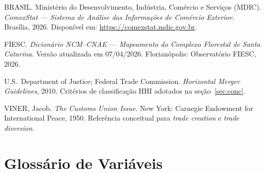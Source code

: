 \documentclass[12pt, a4paper]{article}
\begin{document}
\begin{enumerate}[label={[\arabic*]}]
  \item BRASIL. Ministério do Desenvolvimento, Indústria, Comércio e Serviços
        (MDIC). \textit{ComexStat — Sistema de Análise das Informações de
        Comércio Exterior}. Brasília, 2026. Disponível em: \url{https://comexstat.mdic.gov.br}.

  \item FIESC. \textit{Dicionário NCM--CNAE — Mapeamento do Complexo Florestal
        de Santa Catarina}. Versão atualizada em 07/04/2026.
        Florianópolis: Observatório FIESC, 2026.

  \item U.S.\ Department of Justice; Federal Trade Commission.
        \textit{Horizontal Merger Guidelines}, 2010.
        Critérios de classificação HHI adotados na seção~\ref{sec:conc}.

  \item VINER, Jacob. \textit{The Customs Union Issue}. New York: Carnegie
        Endowment for International Peace, 1950.
        Referência conceitual para \textit{trade creation} e \textit{trade diversion}.
\end{enumerate}

\appendix

\section{Glossário de Variáveis}
\label{app:glossario}
\end{document}
